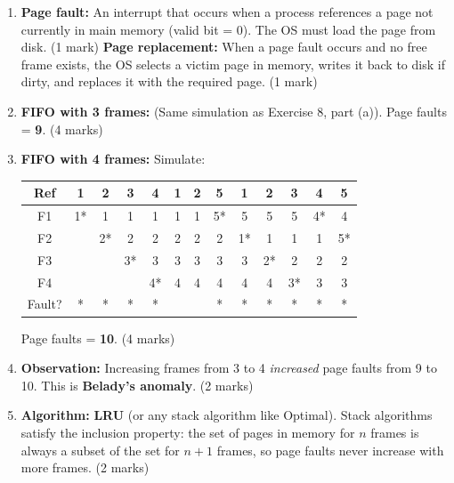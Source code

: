 \documentclass[11pt]{article}
\begin{document}
\begin{corrige}
\begin{enumerate}
\item \textbf{Page fault:} An interrupt that occurs when a process references a page not currently in main memory (valid bit = 0). The OS must load the page from disk. \hfill (1 mark)  
\textbf{Page replacement:} When a page fault occurs and no free frame exists, the OS selects a victim page in memory, writes it back to disk if dirty, and replaces it with the required page. \hfill (1 mark)

\item \textbf{FIFO with 3 frames:} (Same simulation as Exercise 8, part (a)). Page faults = \textbf{9}. \hfill (4 marks)

\item \textbf{FIFO with 4 frames:} Simulate:
\begin{center}
\begin{tabular}{|c|cccccccccccc|}
\hline
Ref & 1 & 2 & 3 & 4 & 1 & 2 & 5 & 1 & 2 & 3 & 4 & 5 \\
\hline
F1 & 1* & 1 & 1 & 1 & 1 & 1 & 5* & 5 & 5 & 5 & 4* & 4 \\
F2 & & 2* & 2 & 2 & 2 & 2 & 2 & 1* & 1 & 1 & 1 & 5* \\
F3 & & & 3* & 3 & 3 & 3 & 3 & 3 & 2* & 2 & 2 & 2 \\
F4 & & & & 4* & 4 & 4 & 4 & 4 & 4 & 3* & 3 & 3 \\
\hline
Fault? & * & * & * & * &  &  & * & * & * & * & * & * \\
\hline
\end{tabular}
\end{center}
Page faults = \textbf{10}. \hfill (4 marks)

\item \textbf{Observation:} Increasing frames from 3 to 4 \emph{increased} page faults from 9 to 10. This is \textbf{Belady's anomaly}. \hfill (2 marks)

\item \textbf{Algorithm:} \textbf{LRU} (or any stack algorithm like Optimal). Stack algorithms satisfy the inclusion property: the set of pages in memory for $n$ frames is always a subset of the set for $n+1$ frames, so page faults never increase with more frames. \hfill (2 marks)
\end{enumerate}
\end{corrige}
\end{document}
